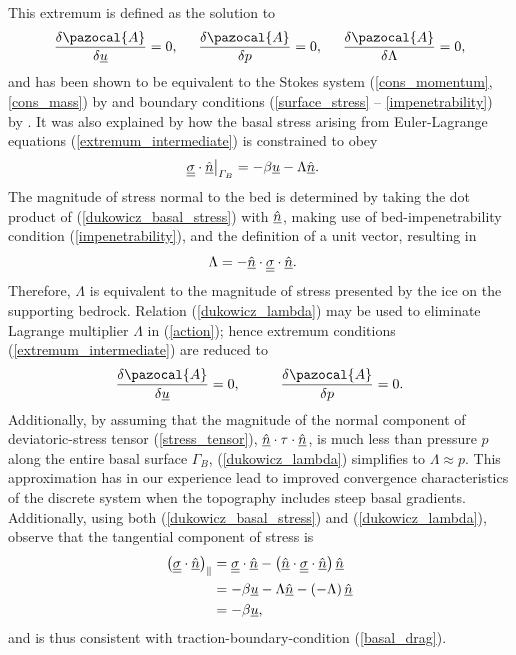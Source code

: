 This extremum is defined as the solution to 
\begin{align}
  \label{extremum_intermediate}
  \frac{\delta \pazocal{A}}{\delta \rankone{u}} = 0, \hspace{5mm} \frac{\delta \pazocal{A}}{\delta p} = 0, \hspace{5mm} \frac{\delta \pazocal{A}}{\delta \Lambda} = 0,
\end{align}
and has been shown to be equivalent to the Stokes system (\ref{cons_momentum}, \ref{cons_mass}) by \citet{dukowicz_2010} and boundary conditions (\ref{surface_stress} -- \ref{impenetrability}) by \citet{dukowicz_2011}.
It was also explained by \citet{dukowicz_2011} how the basal stress arising from Euler-Lagrange equations (\ref{extremum_intermediate}) is constrained to obey
\begin{align}
  \label{dukowicz_basal_stress}
  \underline{\underline{\sigma}} \cdot \underline{\hat{n}} \big|_{\varGamma_B} &= - \beta \underline{u} - \Lambda \underline{\hat{n}}.
\end{align}
The magnitude of stress normal to the bed is determined by taking the dot product of (\ref{dukowicz_basal_stress}) with $\underline{\hat{n}}$, making use of bed-impenetrability condition (\ref{impenetrability}), and the definition of a unit vector, resulting in
\begin{align}
  \label{dukowicz_lambda}
  \Lambda &= - \underline{\hat{n}} \cdot \underline{\underline{\sigma}} \cdot \underline{\hat{n}}.
\end{align}
Therefore, $\Lambda$ is equivalent to the magnitude of stress presented by the ice on the supporting bedrock.  Relation (\ref{dukowicz_lambda}) may be used to eliminate Lagrange multiplier $\Lambda$ in (\ref{action}); hence extremum conditions (\ref{extremum_intermediate}) are reduced to
\begin{align}
  \label{extremum}
  \frac{\delta \pazocal{A}}{\delta \rankone{u}} = 0, \hspace{10mm} \frac{\delta \pazocal{A}}{\delta p} = 0.
\end{align}
Additionally, by assuming that the magnitude of the normal component of deviatoric-stress tensor (\ref{stress_tensor}), $\underline{\hat{n}} \cdot \tau \cdot \underline{\hat{n}}$, is much less than pressure $p$ along the entire basal surface $\Gamma_B$, (\ref{dukowicz_lambda}) simplifies to $\Lambda \approx p$.  This approximation has in our experience lead to improved convergence characteristics of the discrete system when the topography includes steep basal gradients.  Additionally, using both (\ref{dukowicz_basal_stress}) and (\ref{dukowicz_lambda}), observe that the tangential component of stress is
\begin{align}
  \left( \underline{\underline{\sigma}} \cdot \underline{\hat{n}} \right)_{\Vert} &= \underline{\underline{\sigma}} \cdot \underline{\hat{n}} - \left( \underline{\hat{n}} \cdot \underline{\underline{\sigma}} \cdot \underline{\hat{n}}\right) \underline{\hat{n}} \notag \\
  &= - \beta \underline{u} - \Lambda \underline{\hat{n}} - \left( -\Lambda \right) \underline{\hat{n}} \notag \\
  &= - \beta \underline{u},
\end{align}
and is thus consistent with traction-boundary-condition (\ref{basal_drag}).

